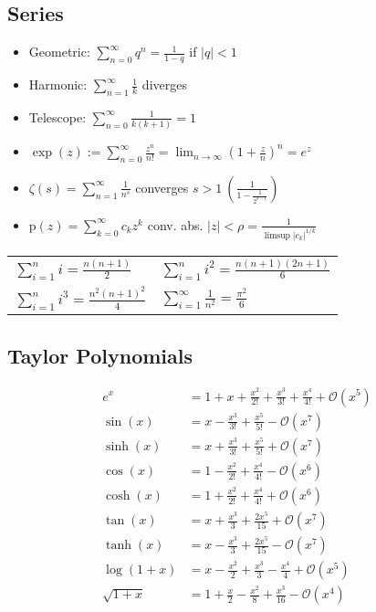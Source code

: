 \documentclass[a4paper, 10pt]{article}
\theoremstyle{definition}
\theoremstyle{named}
\newcommand{\BO}{\mathcal{O}}
\begin{document}
\subsection*{Series}
\begin{itemize}
    \item Geometric: $\sum_{n = 0}^\infty q^n = \frac{1}{1 - q}$ if $|q| < 1$
    \item Harmonic: $\sum_{n = 1}^\infty \frac{1}{k}$ diverges
    \item Telescope: $\sum_{n = 0}^\infty \frac{1}{k(k + 1)} = 1$
    \item $\exp(z) := \sum_{n = 0}^\infty \frac{z^n}{n!} = \lim_{n\to\infty}(1 + \frac{z}{n})^n = e^z$
    \item $\zeta(s) = \sum_{n=1}^\infty \frac{1}{n^s}$ converges $s > 1 \ (\frac{1}{1 - \frac{1}{2^{s-1}}})$
    \item $\text{p}(z) = \sum_{k = 0}^\infty c_kz^k$ conv. abs. $|z| < \rho = \frac{1}{\limsup |c_k|^{1/k}}$
\end{itemize}
\begin{tabularx}{\linewidth}{XX}
    \toprule
    $\sum\limits_{i=1}^n i = \frac{n(n+1)}{2}$ & $\sum\limits_{i=1}^n i^2 = \frac{n(n+1)(2n + 1)}{6}$ \\
    $\sum\limits_{i=1}^n i^3 = \frac{n^2(n+1)^2}{4}$ & $\sum\limits_{i=1}^\infty \frac{1}{n^2} = \frac{\pi^2}{6}$ \\
    \bottomrule
\end{tabularx}

\subsection*{Taylor Polynomials}
\begin{align*}
    e^x &= 1 + x + \frac{x^2}{2!} + \frac{x^3}{3!} + \frac{x^4}{4!} + \BO(x^5) \\
    \sin(x) &= x - \frac{x^3}{3!} + \frac{x^5}{5!} - \BO(x^7) \\
    \sinh(x) &= x + \frac{x^3}{3!} + \frac{x^5}{5!} + \BO(x^7) \\
    \cos(x) &= 1 - \frac{x^2}{2!} + \frac{x^4}{4!} - \BO(x^6) \\
    \cosh(x) &= 1 + \frac{x^2}{2!} + \frac{x^4}{4!} + \BO(x^6) \\
    \tan(x) &= x + \frac{x^3}{3} + \frac{2x^5}{15} + \BO(x^7) \\
    \tanh(x) &= x - \frac{x^3}{3} + \frac{2x^5}{15} - \BO(x^7) \\
    \log(1+x) &= x - \frac{x^2}{2} + \frac{x^3}{3} - \frac{x^4}{4} + \BO(x^5) \\
    \sqrt{1 + x} &= 1 + \frac{x}{2} - \frac{x^2}{8} + \frac{x^3}{16} - \BO(x^4)
\end{align*}
\end{document}
